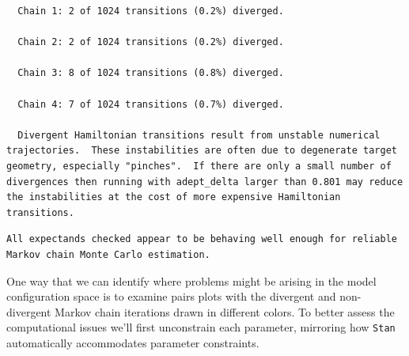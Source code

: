\documentclass[
  letterpaper,
  DIV=11,
  numbers=noendperiod]{scrartcl}
\newenvironment{Shaded}{\begin{snugshade}}{\end{snugshade}}
\newcommand{\FunctionTok}[1]{\textcolor[rgb]{0.28,0.35,0.67}{#1}}
\newcommand{\NormalTok}[1]{\textcolor[rgb]{0.00,0.23,0.31}{#1}}
\newcommand{\OtherTok}[1]{\textcolor[rgb]{0.00,0.23,0.31}{#1}}
\newcommand{\SpecialCharTok}[1]{\textcolor[rgb]{0.37,0.37,0.37}{#1}}
\newcommand{\StringTok}[1]{\textcolor[rgb]{0.13,0.47,0.30}{#1}}
\begin{document}
\begin{verbatim}
  Chain 1: 2 of 1024 transitions (0.2%) diverged.

  Chain 2: 2 of 1024 transitions (0.2%) diverged.

  Chain 3: 8 of 1024 transitions (0.8%) diverged.

  Chain 4: 7 of 1024 transitions (0.7%) diverged.

  Divergent Hamiltonian transitions result from unstable numerical
trajectories.  These instabilities are often due to degenerate target
geometry, especially "pinches".  If there are only a small number of
divergences then running with adept_delta larger than 0.801 may reduce
the instabilities at the cost of more expensive Hamiltonian
transitions.
\end{verbatim}

\begin{Shaded}
\end{Shaded}

\begin{verbatim}
All expectands checked appear to be behaving well enough for reliable
Markov chain Monte Carlo estimation.
\end{verbatim}

One way that we can identify where problems might be arising in the
model configuration space is to examine pairs plots with the divergent
and non-divergent Markov chain iterations drawn in different colors. To
better assess the computational issues we'll first unconstrain each
parameter, mirroring how \texttt{Stan} automatically accommodates
parameter constraints.
\end{document}

